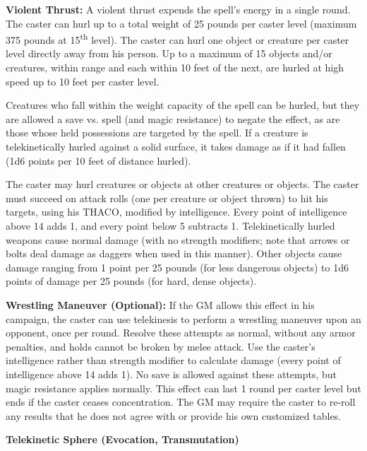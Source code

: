 \begin{multicols}{2}
\textbf{Violent Thrust:} A violent thrust expends the spell's energy in a single round.  The caster can hurl up to a total weight of 25 pounds per caster level (maximum 375 pounds at 15\textsuperscript{th} level).  The caster can hurl one object or creature per caster level directly away from his person.  Up to a maximum of 15 objects and/or creatures, within range and each within 10 feet of the next, are hurled at high speed up to 10 feet per caster level.  

Creatures who fall within the weight capacity of the spell can be hurled, but they are allowed a save vs. spell (and magic resistance) to negate the effect, as are those whose held possessions are targeted by the spell.  If a creature is telekinetically hurled against a solid surface, it takes damage as if it had fallen (1d6 points per 10 feet of distance hurled).

The caster may hurl creatures or objects at other creatures or objects.  The caster must succeed on attack rolls (one per creature or object thrown) to hit his targets, using his THACO, modified by intelligence.  Every point of intelligence above 14 adds 1, and every point below 5 subtracts 1.  Telekinetically hurled weapons cause normal damage (with no strength modifiers; note that arrows or bolts deal damage as daggers when used in this manner). Other objects cause damage ranging from 1 point per 25 pounds (for less dangerous objects) to 1d6 points of damage per 25 pounds (for hard, dense objects). 

\textbf{Wrestling Maneuver (Optional):} If the GM allows this effect in his campaign, the caster can use telekinesis to perform a wrestling maneuver upon an opponent, once per round.  Resolve these attempts as normal, without any armor penalties, and holds cannot be broken by melee attack.  Use the caster's intelligence rather than strength modifier to calculate damage (every point of intelligence above 14 adds 1).  No save is allowed against these attempts, but magic resistance applies normally.  This effect can last 1 round per caster level but ends if the caster ceases concentration.  The GM may require the caster to re-roll any results that he does not agree with or provide his own customized tables.

\vspace{1em}

\noindent
\begin{minipage}{\columnwidth}

\noindent \textbf{Telekinetic Sphere (Evocation, Transmutation)}


\end{minipage}
\end{multicols}
